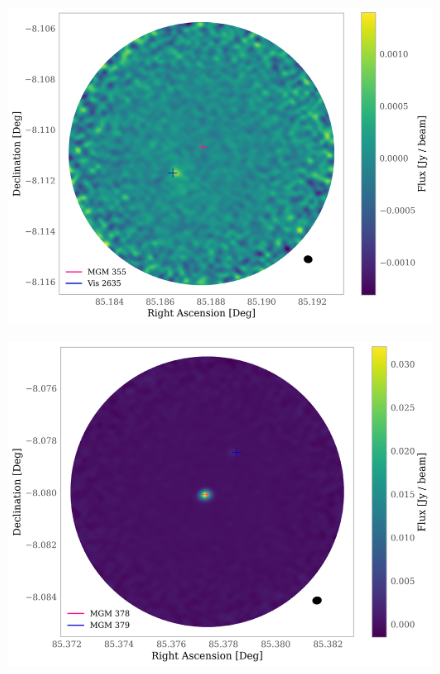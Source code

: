 \documentclass{aa}
\begin{document}
\begin{appendix}
\begin{figure}
\centering
   \includegraphics[width=\columnwidth]{MGM_355.png}
     \caption{}
\end{figure}

\begin{figure}
\centering
   \includegraphics[width=\columnwidth]{MGM_378.png}
     \caption{}
\end{figure}


\end{appendix}
\end{document}
